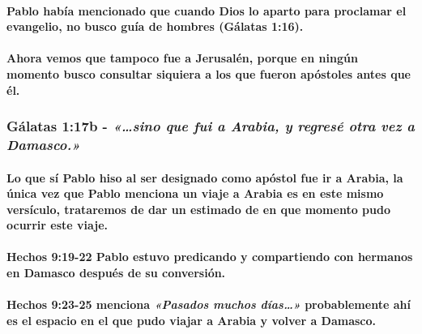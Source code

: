 \documentclass[11a pt,twoside]{article}
\newcommand{\scripture}[1]{%
  {\fontsize{12pt}{16pt}\selectfont\ScriptureFont\itshape #1}%
}
\let\oldsubsubsection\subsubsection
\renewcommand{\subsubsection}{\needspace{4\baselineskip}\oldsubsubsection}
\let\oldparagraph\paragraph
\renewcommand{\paragraph}{\needspace{3\baselineskip}\oldparagraph}
\begin{document}
\paragraph{Pablo había mencionado que cuando Dios lo aparto para
proclamar el evangelio, no busco guía de hombres (Gálatas
1:16).}\label{pablo-habuxeda-mencionado-que-cuando-dios-lo-aparto-para-proclamar-el-evangelio-no-busco-guuxeda-de-hombres-guxe1latas-116.}

\paragraph{Ahora vemos que tampoco fue a Jerusalén, porque en ningún
momento busco consultar siquiera a los que fueron apóstoles antes que
él.}\label{ahora-vemos-que-tampoco-fue-a-jerusaluxe9n-porque-en-ninguxfan-momento-busco-consultar-siquiera-a-los-que-fueron-apuxf3stoles-antes-que-uxe9l.}

\subsubsection{\texorpdfstring{Gálatas 1:17b -
\scripture{«…sino que fui a Arabia, y regresé otra vez a Damasco.»}}{Gálatas 1:17b - }}\label{guxe1latas-117b---sino-que-fui-a-arabia-y-regresuxe9-otra-vez-a-damasco.}

\paragraph{Lo que sí Pablo hiso al ser designado como apóstol fue ir a
Arabia, la única vez que Pablo menciona un viaje a Arabia es en este
mismo versículo, trataremos de dar un estimado de en que momento pudo
ocurrir este
viaje.}\label{lo-que-suxed-pablo-hiso-al-ser-designado-como-apuxf3stol-fue-ir-a-arabia-la-uxfanica-vez-que-pablo-menciona-un-viaje-a-arabia-es-en-este-mismo-versuxedculo-trataremos-de-dar-un-estimado-de-en-que-momento-pudo-ocurrir-este-viaje.}

\paragraph{Hechos 9:19-22 Pablo estuvo predicando y compartiendo con
hermanos en Damasco después de su
conversión.}\label{hechos-919-22-pablo-estuvo-predicando-y-compartiendo-con-hermanos-en-damasco-despuuxe9s-de-su-conversiuxf3n.}

\paragraph{\texorpdfstring{Hechos 9:23-25 menciona
\scripture{«Pasados muchos días…»} probablemente ahí es el espacio en el
que pudo viajar a Arabia y volver a
Damasco.}{Hechos 9:23-25 menciona  probablemente ahí es el espacio en el que pudo viajar a Arabia y volver a Damasco.}}\label{hechos-923-25-menciona-pasados-muchos-duxedas-probablemente-ahuxed-es-el-espacio-en-el-que-pudo-viajar-a-arabia-y-volver-a-damasco.}
\end{document}
